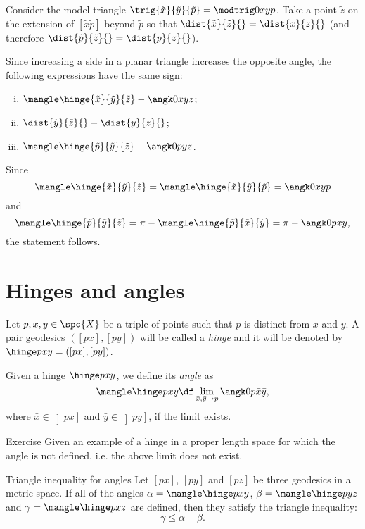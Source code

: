 Consider the model triangle $\trig{\tilde x}{\tilde y}{\tilde p}=\modtrig0 x y p$.
Take 
a point $\tilde z$ on the extension of 
$[\tilde x \tilde p]$ beyond $\tilde p$ so that $\dist{\tilde x}{\tilde z}{}=\dist{x}{z}{}$ (and therefore $\dist{\tilde p}{\tilde z}{}=\dist{p}{z}{}$). 
 
Since increasing a side in a planar triangle increases the opposite angle, 
the following expressions have the same sign:
\begin{enumerate}[(i)]
\item $\mangle\hinge{\tilde x}{\tilde y}{\tilde z}-\angk0{x}{y}{z}$;
\item $\dist{\tilde y}{\tilde z}{}-\dist{y}{z}{}$;
\item $\mangle\hinge{\tilde p}{\tilde y}{\tilde z}-\angk0{p}{y}{z}$.
\end{enumerate}
Since 
\[\mangle\hinge{\tilde x}{\tilde y}{\tilde z}=\mangle\hinge{\tilde x}{\tilde y}{\tilde p}=\angk0{x}{y}{p}\]
and
\[ \mangle\hinge{\tilde p}{\tilde y}{\tilde z}
=\pi-\mangle\hinge{\tilde p}{\tilde x}{\tilde y}
=\pi-\angk0{p}{x}{y},\]
the statement follows.
\qeds


\section{Hinges and angles}

Let $p,x,y\in \spc{X}$ be a triple of points such that $p$ is distinct from $x$ and $y$.
A pair geodesics $([p x],[p y])$ will be called a \emph{hinge} and it will be denoted by 
$\hinge p x y=([p x],[p y])$\index{$\hinge{{*}}{{*}}{{*}}$}.


Given a hinge $\hinge p x y$, we define its \emph{angle} as 
\index{$\mangle$!$\mangle\hinge{{*}}{{*}}{{*}}$}
\[\mangle\hinge p x y
\df
\lim_{\bar x,\bar y\to p} \angk0 p{\bar x}{\bar y},\]
where $\bar x\in\left ]p x\right]$ and $\bar y\in\left]p y\right]$, if the limit exists.

\begin{thm}{Exercise}
Given an example of a hinge in a proper length space for which the angle is not defined, i.e. the above limit does not exist.
\end{thm}



\begin{thm}{Triangle inequality for angles}
\label{claim:angle-3angle-inq}
Let  $[px]$, $[py]$ and $[pz]$  
be three geodesics in a metric space.
If all of the angles $\alpha=\mangle\hinge p {x}{y}$, $\beta=\mangle\hinge p {y}{z}$ and $\gamma=\mangle\hinge p {x}{z}$ are defined, then they satisfy the triangle inequality:
\[\gamma\le \alpha+\beta.\]

\end{thm}

